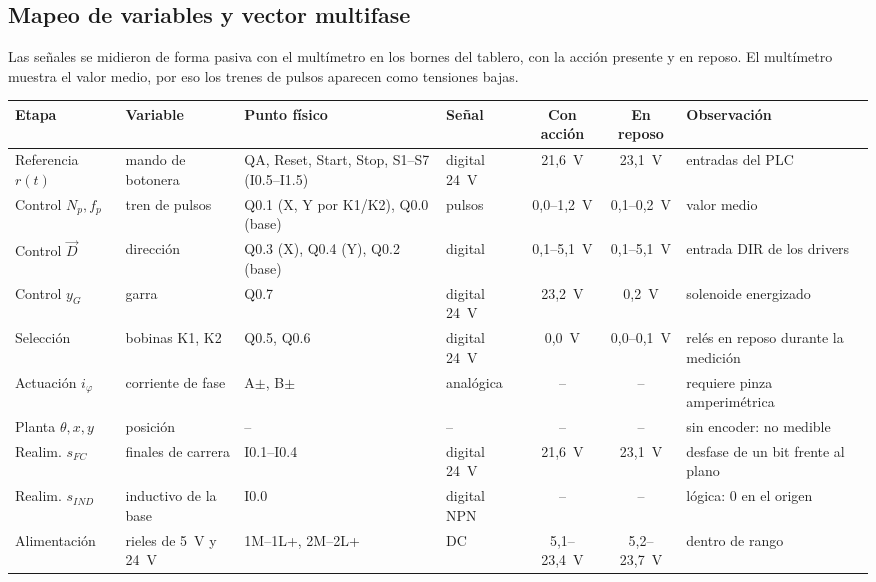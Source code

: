 \documentclass[a4paper,11pt]{article}
\begin{document}
\subsection{Mapeo de variables y vector multifase}
Las señales se midieron de forma pasiva con el multímetro en los bornes del tablero, con la acción presente y en reposo. El multímetro muestra el valor medio, por eso los trenes de pulsos aparecen como tensiones bajas.
\begin{center}\footnotesize
\begin{longtable}{>{\raggedright}p{1.9cm} >{\raggedright}p{2.2cm} >{\raggedright}p{2.6cm} >{\raggedright}p{1.5cm} c c >{\raggedright\arraybackslash}p{2.3cm}}
\toprule
\textbf{Etapa} & \textbf{Variable} & \textbf{Punto físico} & \textbf{Señal} & \textbf{Con acción} & \textbf{En reposo} & \textbf{Observación}\\
\midrule\endhead
Referencia $r(t)$ & mando de botonera & QA, Reset, Start, Stop, S1--S7 (I0.5--I1.5) & digital 24~V & 21,6~V & 23,1~V & entradas del PLC\\
Control $N_p, f_p$ & tren de pulsos & Q0.1 (X, Y por K1/K2), Q0.0 (base) & pulsos & 0,0--1,2~V & 0,1--0,2~V & valor medio\\
Control $\vec D$ & dirección & Q0.3 (X), Q0.4 (Y), Q0.2 (base) & digital & 0,1--5,1~V & 0,1--5,1~V & entrada DIR de los drivers\\
Control $y_G$ & garra & Q0.7 & digital 24~V & 23,2~V & 0,2~V & solenoide energizado\\
Selección & bobinas K1, K2 & Q0.5, Q0.6 & digital 24~V & 0,0~V & 0,0--0,1~V & relés en reposo durante la medición\\
Actuación $i_\varphi$ & corriente de fase & A$\pm$, B$\pm$ & analógica & -- & -- & requiere pinza amperimétrica\\
Planta $\theta, x, y$ & posición & -- & -- & -- & -- & sin encoder: no medible\\
Realim. $s_{FC}$ & finales de carrera & I0.1--I0.4 & digital 24~V & 21,6~V & 23,1~V & desfase de un bit frente al plano\\
Realim. $s_{IND}$ & inductivo de la base & I0.0 & digital NPN & -- & -- & lógica: 0 en el origen\\
Alimentación & rieles de 5~V y 24~V & 1M--1L+, 2M--2L+ & DC & 5,1--23,4~V & 5,2--23,7~V & dentro de rango\\
\bottomrule
\end{longtable}\end{center}

\end{document}
